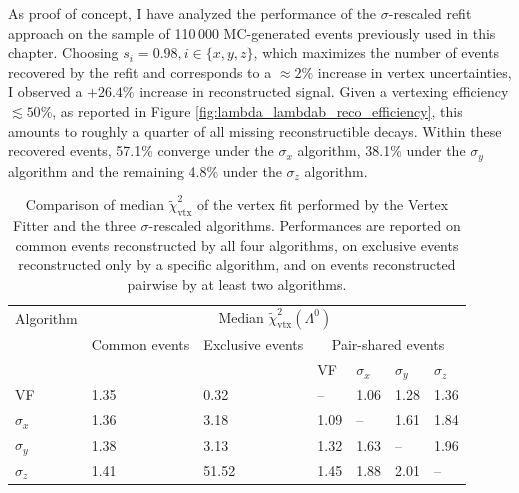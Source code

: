 As proof of concept, I have analyzed the performance of the $\sigma$-rescaled refit approach on the sample of 110\,000 MC-generated \demonstratorshort events previously used in this chapter.
Choosing $s_i=0.98, i\in\{x,y,z\}$, which maximizes the number of events recovered by the refit and corresponds to a $\approx 2\%$ increase in vertex uncertainties, I observed a $+26.4\%$ increase in reconstructed signal.
Given a vertexing efficiency $\lesssim 50\%$, as reported in Figure \ref{fig:lambda_lambdab_reco_efficiency}, this amounts to roughly a quarter of all missing reconstructible decays.
Within these recovered events, 57.1\% converge under the $\sigma_x$ algorithm, 38.1\% under the $\sigma_y$ algorithm and the remaining 4.8\% under the $\sigma_z$ algorithm.

\begin{table}[t]
	\begin{center}
	\begin{tabular}{@{}lllllll@{}}
		\toprule
		Algorithm & \multicolumn{6}{c}{Median $\tilde{\chi}^2_\text{vtx}(\Lambda^0)$} \\
		\cmidrule{2-7}
		& Common events & Exclusive events & \multicolumn{4}{c}{Pair-shared events}  \\
		\cmidrule{4-7}
		&&& VF & $\sigma_x$ & $\sigma_y$ & $\sigma_z$ \\
		\midrule
		VF 			& 1.35 & 0.32	& --	& 1.06	& 1.28	& 1.36	 \\
		$\sigma_x$ 	& 1.36 & 3.18	& 1.09	& --	& 1.61	& 1.84	 \\
		$\sigma_y$	& 1.38 & 3.13	& 1.32	& 1.63	& -- 	& 1.96	 \\
		$\sigma_z$ 	& 1.41 & 51.52	& 1.45	& 1.88	& 2.01	& --	 \\
		\bottomrule
	\end{tabular}
	\end{center}
	\caption{Comparison of median $\tilde{\chi}^2_\text{vtx}$ of the \lambdadecay vertex fit performed by the Vertex Fitter and the three $\sigma$-rescaled algorithms. Performances are reported on common events reconstructed by all four algorithms, on exclusive events reconstructed only by a specific algorithm, and on events reconstructed pairwise by at least two algorithms.}
	\label{tab:3:xyz_chi2_performances}
\end{table}

